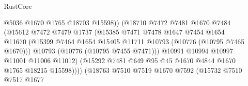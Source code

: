 \begin{lexlean}{RustCore}
\begin{coremodule}
                                        @5036
                                        @1670
                                        @1765
                                        @18703
                                        @15598))
                                    (@18710
                                      @7472
                                      @7481
                                      @1670
                                      @7484
                                      (@15612
                                        @7472
                                        @7479
                                        @1737
                                        (@15385
                                          @7471
                                          @7478
                                          @1647
                                          @7454
                                          @1654
                                          @11670
                                          (@15399
                                            @7464
                                            @1654
                                            @15405
                                            @11711
                                            @10793
                                            (@10776 (@10795 @7465 @1670)))
                                          @10793
                                          (@10776 (@10795 @7455 @7471)))
                                        @10991
                                        @10994
                                        @10997
                                        @11001
                                        @11006
                                        @11012)
                                      (@15292
                                        @7481
                                        @649
                                        @95
                                        @45
                                        @1670
                                        @4844
                                        @1670
                                        @1765
                                        @18215
                                        @15598))))
                                (@18763
                                  @7510
                                  @7519
                                  @1670
                                  @7592
                                  (@15732
                                    @7510
                                    @7517
                                    @1677

\end{coremodule}
\end{lexlean}
